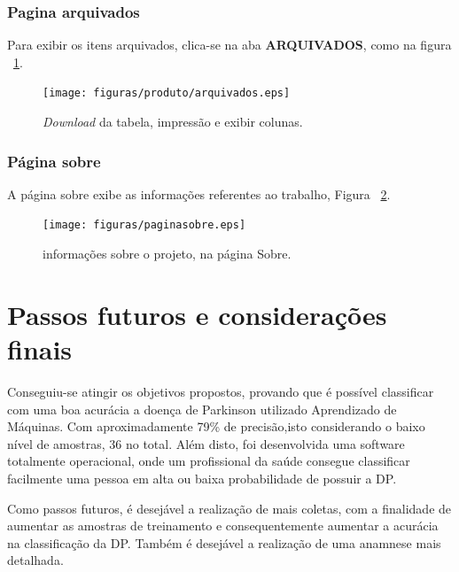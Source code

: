 \subsubsection{Pagina arquivados}
Para exibir os itens arquivados, clica-se na aba \textbf{ARQUIVADOS}, como na figura ~\ref{farquivados}.
\begin{figure}[!htb]
    \centering
    \texttt{[image: figuras/produto/arquivados.eps]}
    \caption{\textit{Download} da tabela, impressão e exibir colunas.}
    \label{farquivados}
\end{figure}

\subsubsection{Página sobre}
A página sobre exibe as informações referentes ao trabalho, Figura ~\ref{fsobre}.
\begin{figure}[!htb]
    \centering
    \texttt{[image: figuras/paginasobre.eps]}
    \caption{informações sobre o projeto, na página Sobre.}
    \label{fsobre}
\end{figure}

\section{Passos futuros e considerações finais}
   Conseguiu-se atingir os objetivos propostos, provando que é possível classificar com uma boa acurácia a doença de Parkinson utilizado Aprendizado de Máquinas. Com aproximadamente 79\% de precisão,isto considerando o baixo nível de amostras, 36 no total. Além disto, foi desenvolvida uma software totalmente operacional, onde um profissional da saúde consegue classificar facilmente uma pessoa em alta ou baixa probabilidade de possuir a DP.

   Como passos futuros, é desejável a realização de mais coletas, com a finalidade de aumentar as amostras de treinamento e consequentemente aumentar a acurácia na classificação da DP. Também é desejável a realização de uma anamnese mais detalhada.
